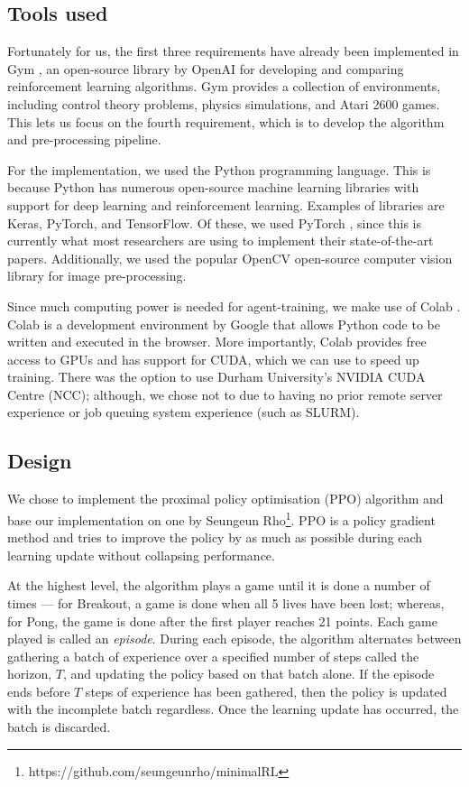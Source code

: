\documentclass[12pt,a4paper]{article}
\begin{document}
\subsection{Tools used}
Fortunately for us, the first three requirements have already been implemented in Gym \cite{1606.01540}, an open-source library by OpenAI for developing and comparing reinforcement learning algorithms. Gym provides a collection of environments, including control theory problems, physics simulations, and Atari 2600 games. This lets us focus on the fourth requirement, which is to develop the algorithm and pre-processing pipeline.

For the implementation, we used the Python programming language. This is because Python has numerous open-source machine learning libraries with support for deep learning and reinforcement learning. Examples of libraries are Keras, PyTorch, and TensorFlow. Of these, we used PyTorch \cite{NEURIPS2019_9015}, since this is currently what most researchers are using to implement their state-of-the-art papers. Additionally, we used the popular OpenCV \cite{opencv_library} open-source computer vision library for image pre-processing.

Since much computing power is needed for agent-training, we make use of Colab \cite{}. Colab is a development environment by Google that allows Python code to be written and executed in the browser. More importantly, Colab provides free access to GPUs and has support for CUDA, which we can use to speed up training. There was the option to use Durham University's NVIDIA CUDA Centre (NCC); although, we chose not to due to having no prior remote server experience or job queuing system experience (such as SLURM).

\subsection{Design}
We chose to implement the proximal policy optimisation (PPO) algorithm \cite{DBLP:journals/corr/SchulmanWDRK17} and base our implementation on one by Seungeun Rho\footnote{https://github.com/seungeunrho/minimalRL}. PPO is a policy gradient method and tries to improve the policy by as much as possible during each learning update without collapsing performance. 

At the highest level, the algorithm plays a game until it is done a number of times --- for Breakout, a game is done when all 5 lives have been lost; whereas, for Pong, the game is done after the first player reaches 21 points. Each game played is called an \emph{episode}. During each episode, the algorithm alternates between gathering a batch of experience over a specified number of steps called the horizon, $T$, and updating the policy based on that batch alone. If the episode ends before $T$ steps of experience has been gathered, then the policy is updated with the incomplete batch regardless. Once the learning update has occurred, the batch is discarded.  
\end{document}
